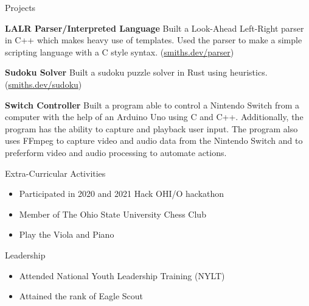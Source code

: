 \documentclass{resume}
\begin{document}
\begin{rSection}{Projects}
    \vspace{-1.25em}
    \item \textbf{LALR Parser/Interpreted Language} Built a Look-Ahead Left-Right parser in C++ which makes heavy use of templates.
    Used the parser to make a simple scripting language with a C style syntax.
    (\href{https://smiths.dev/parser}{smiths.dev/parser})
    \item \textbf{Sudoku Solver} Built a sudoku puzzle solver in Rust using heuristics.
    (\href{https://smiths.dev/sudoku}{smiths.dev/sudoku})
    \item \textbf{Switch Controller} Built a program able to control a Nintendo Switch
    from a computer with the help of an Arduino Uno using C and C++.
    Additionally, the program has the ability to capture and playback user input.
    The program also uses FFmpeg to capture video and audio data from the Nintendo Switch
    and to preferform video and audio processing to automate actions.
\end{rSection}

\begin{rSection}{Extra-Curricular Activities}
    \begin{itemize}
        \item Participated in 2020 and 2021 Hack OHI/O hackathon
        \item Member of The Ohio State University Chess Club
        \item Play the Viola and Piano
    \end{itemize}
\end{rSection}

\begin{rSection}{Leadership}
    \begin{itemize}
        \item Attended National Youth Leadership Training (NYLT)
        \item Attained the rank of Eagle Scout
    \end{itemize}
\end{rSection}
\end{document}
